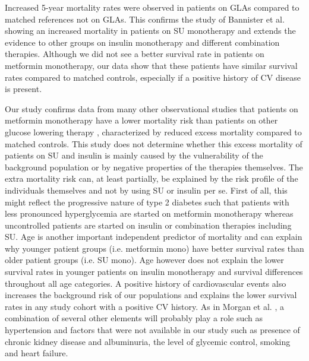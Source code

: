 Increased 5-year mortality rates were observed in patients on GLAs compared to matched references not on GLAs. This confirms the study of Bannister et al. \citep{s9} showing an increased mortality in patients on SU monotherapy and extends the evidence to other groups on insulin monotherapy and different combination therapies. Although we did not see a better survival rate in patients on metformin monotherapy, our data show that these patients have similar survival rates compared to matched controls, especially if a positive history of CV disease is present. 

Our study confirms data from many other observational studies that patients on metformin monotherapy have a lower mortality risk than patients on other glucose lowering therapy \citep{s3,s4,s5,s6,s7,s8}, characterized by reduced excess mortality compared to matched controls. This study does not determine whether this excess mortality of patients on SU and insulin is mainly caused by the vulnerability of the background population or by negative properties of the therapies themselves. The extra mortality risk can, at least partially, be explained by the risk profile of the individuals themselves and not by using SU or insulin per se. First of all, this might reflect the progressive nature of type 2 diabetes such that patients with less pronounced hyperglycemia are started on metformin monotherapy whereas uncontrolled patients are started on insulin or combination therapies including SU. Age is another important independent predictor of mortality and can explain why younger patient groups (i.e. metformin mono) have better survival rates than older patient groups (i.e. SU mono). Age however does not explain the lower survival rates in younger patients on insulin monotherapy and survival differences throughout all age categories. A positive history of cardiovascular events also increases the background risk of our populations and explains the lower survival rates in any study cohort with a positive CV history.  As in Morgan et al. \citep{s7}, a combination of several other elements will probably play a role such as hypertension and factors that were not available in our study such as presence of chronic kidney disease and albuminuria, the level of glycemic control, smoking and heart failure.

